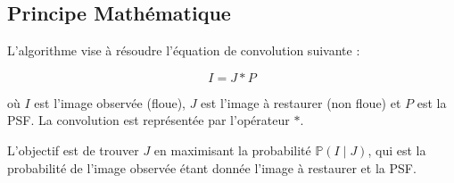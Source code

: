 \subsection{Principe Mathématique}
L'algorithme vise à résoudre l'équation de convolution suivante :

\begin{equation}
I = J \ast P
\end{equation}

où \( I \) est l'image observée (floue), \( J \) est l'image à restaurer (non floue) et \( P \) est la PSF. La convolution est représentée par l'opérateur \( \ast \).

L'objectif est de trouver \( J \) en maximisant la probabilité \( \mathbb{P}(I \mid J) \), qui est la probabilité de l'image observée étant donnée l'image à restaurer et la PSF.
